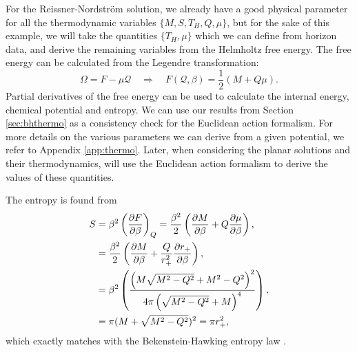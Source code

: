 For the Reissner-Nordstr\"om solution, we already have a good physical parameter for all the thermodynamic variables $\{ M, S, T_{H}, Q, \mu \}$, but for the sake of this example, we will take the quantities $\{T_{H}, \mu\}$ which we can define from horizon data, and derive the remaining variables from the Helmholtz free energy. The free energy can be calculated from the Legendre transformation:
\begin{equation*}
	\Omega = F - \mu \mathcal{Q} \quad \Rightarrow \quad F(\mathcal{Q}, \beta) = \frac{1}{2} (M + Q \mu).
\end{equation*}
Partial derivatives of the free energy can be used to calculate the internal energy, chemical potential and entropy. We can use our results from Section \ref{sec:bhthermo} as a consistency check for the Euclidean action formalism. For more details on the various parameters we can derive from a given potential, we refer to Appendix \ref{app:thermo}. Later, when considering the planar solutions and their thermodynamics, will use the Euclidean action formalism to derive the values of these quantities. 

The entropy is found from
\begin{equation*}
	\begin{aligned}
		S &= \beta^2 \left(\frac{\partial F}{\partial \beta} \right)_Q = \frac{\beta^2}{2} \left(\frac{\partial M}{\partial \beta} + Q\frac{\partial \mu}{\partial \beta} \right) ,\\
		&= \frac{\beta^2}{2}\left(\frac{\partial M}{\partial \beta} + \frac{Q}{r_+^2}\frac{\partial r_+}{\partial \beta} \right), \\
		&=\beta^2 \left(\frac{\left(M\sqrt{M^2 - Q^2} + M^2 - Q^2\right)^2}{4\pi \left(\sqrt{M^2 - Q^2} + M\right)^4} \right), \\
		&= \pi (M + \sqrt{M^2 - Q^2})^2 = \pi r_+^2,
	\end{aligned}
\end{equation*}
which exactly matches with the Bekenstein-Hawking entropy law .


